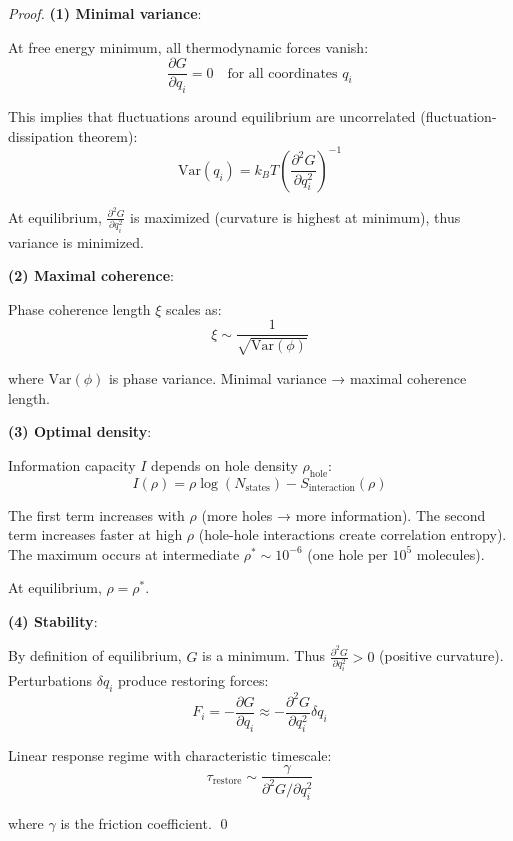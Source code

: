 \begin{proof}
\textbf{(1) Minimal variance}:

At free energy minimum, all thermodynamic forces vanish:
\begin{equation}
\frac{\partial G}{\partial q_i} = 0 \quad \text{for all coordinates } q_i
\end{equation}

This implies that fluctuations around equilibrium are uncorrelated (fluctuation-dissipation theorem):
\begin{equation}
\text{Var}(q_i) = k_B T \left(\frac{\partial^2 G}{\partial q_i^2}\right)^{-1}
\end{equation}

At equilibrium, $\frac{\partial^2 G}{\partial q_i^2}$ is maximized (curvature is highest at minimum), thus variance is minimized.

\textbf{(2) Maximal coherence}:

Phase coherence length $\xi$ scales as:
\begin{equation}
\xi \sim \frac{1}{\sqrt{\text{Var}(\phi)}}
\end{equation}

where $\text{Var}(\phi)$ is phase variance. Minimal variance → maximal coherence length.

\textbf{(3) Optimal density}:

Information capacity $I$ depends on hole density $\rho_{\text{hole}}$:
\begin{equation}
I(\rho) = \rho \log(N_{\text{states}}) - S_{\text{interaction}}(\rho)
\end{equation}

The first term increases with $\rho$ (more holes → more information). The second term increases faster at high $\rho$ (hole-hole interactions create correlation entropy). The maximum occurs at intermediate $\rho^* \sim 10^{-6}$ (one hole per $10^5$  molecules).

At equilibrium, $\rho = \rho^*$.

\textbf{(4) Stability}:

By definition of equilibrium, $G$ is a minimum. Thus $\frac{\partial^2 G}{\partial q_i^2} > 0$ (positive curvature). Perturbations $\delta q_i$ produce restoring forces:
\begin{equation}
F_i = -\frac{\partial G}{\partial q_i} \approx -\frac{\partial^2 G}{\partial q_i^2} \delta q_i
\end{equation}

Linear response regime with characteristic timescale:
\begin{equation}
\tau_{\text{restore}} \sim \frac{\gamma}{\partial^2 G / \partial q_i^2}
\end{equation}

where $\gamma$ is the friction coefficient. \qed
\end{proof}

